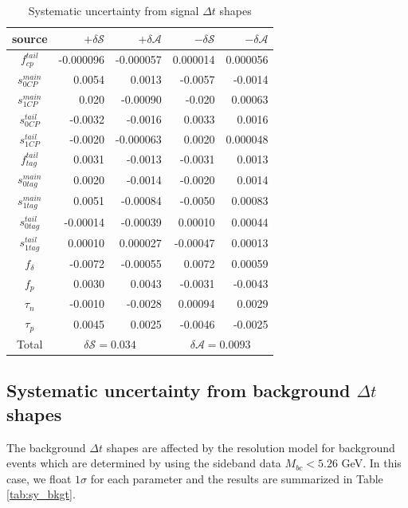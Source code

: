 \begin{table}[htpb]
\begin{minipage}[b]{1.0\linewidth}
\centering
\caption{Systematic uncertainty from signal $\Delta t$ shapes}
\label{tab:sy_sigt}
\begin{tabular}{c r r r r}
\hline
source & $+\delta \mathcal{S}$ & $+\delta \mathcal{A}$ & $-\delta \mathcal{S}$ &  $-\delta \mathcal{A}$\\
\hline
$f_{cp}^{tail}$ & -0.000096 & -0.000057
& 0.000014
& 0.000056
\\
$s_{0CP}^{main}$& 0.0054
& 0.0013
& -0.0057
& -0.0014
\\
$s_{1CP}^{main}$ & 0.020
& -0.00090
& -0.020
& 0.00063
\\
$s_{0CP}^{tail}$ &  -0.0032
& -0.0016
& 0.0033
& 0.0016
\\
$s_{1CP}^{tail}$ & -0.0020	
&-0.000063	
&0.0020	
&0.000048
\\
$f_{tag}^{tail}$ & 0.0031
& -0.0013
& -0.0031
& 0.0013
\\
$s_{0tag}^{main}$&  0.0020
& -0.0014
& -0.0020
& 0.0014
\\
$s_{1tag}^{main}$ & 0.0051
& -0.00084
& -0.0050
& 0.00083
\\
$s_{0tag}^{tail}$ &  -0.00014
& -0.00039
& 0.00010 & 0.00044
\\
$s_{1tag}^{tail}$  & 0.00010& 0.000027 &  -0.00047
& 0.00013
\\
$f_{\delta}$ & -0.0072
& -0.00055
& 0.0072
& 0.00059
\\
$f_p$ &  0.0030
& 0.0043
& -0.0031
& -0.0043
\\
$\tau_n$ & -0.0010 & -0.0028
& 0.00094
& 0.0029
\\
$\tau_p$ &  0.0045
& 0.0025
& -0.0046
& -0.0025
\\
\hline
Total &
\multicolumn{2}{c}{$\delta \mathcal{S}=0.034$} &
\multicolumn{2}{c}{$\delta \mathcal{A}=0.0093$}\\
\hline
\end{tabular}
\end{minipage}
\end{table}

\subsection{Systematic uncertainty from background $\Delta t$ shapes}
The background $\Delta t$ shapes are affected by the resolution model for background events which are
determined by using the sideband data $M_{bc}<5.26$ GeV. In this case, we float $1\sigma$ for each parameter and the results are summarized in Table \ref{tab:sy_bkgt}.

